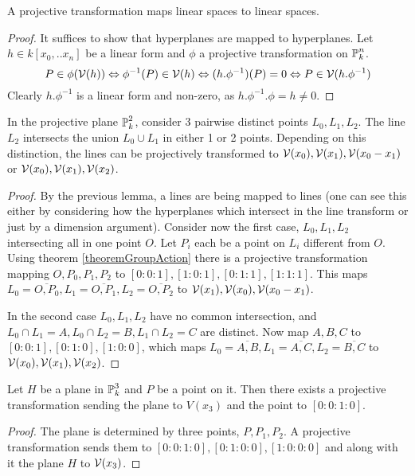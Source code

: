 \begin{lemma} \label{lemmaTransformOfLinearSpaces}
A projective transformation maps linear spaces to linear spaces.
\end{lemma}
\begin{proof}
It suffices to show that hyperplanes are mapped to hyperplanes.
Let $h \in k[x_0,..x_n]$ be a linear form and $\phi$ a projective transformation on $\operatorname{\mathbb P}^n_k$.
\begin{equation}
P \in \phi(\operatorname{\mathcal V}(h)) \Leftrightarrow \phi^{-1}(P) \in \operatorname{\mathcal V}(h) \Leftrightarrow (h.\phi^{-1})(P) = 0 \Leftrightarrow P \in \operatorname{\mathcal V}(h.\phi^{-1})
\end{equation}
Clearly $h.\phi^{-1}$ is a linear form and non-zero, as $h.\phi^{-1}.\phi = h \neq 0$.
\end{proof}


\begin{corollary}
In the projective plane $\operatorname{\mathbb P}^2_k$, consider 3 pairwise distinct points $L_0,L_1,L_2$.
The line $L_2$ intersects the union $L_0 \cup L_1$ in either 1 or 2 points.
Depending on this distinction, the lines can be projectively transformed to $\operatorname{\mathcal V}(x_0),\operatorname{\mathcal V}(x_1),\operatorname{\mathcal V}(x_0-x_1)$ or $\operatorname{\mathcal V}(x_0),\operatorname{\mathcal V}(x_1),\operatorname{\mathcal V}(x_2)$.
\end{corollary}
\begin{proof}
By the previous lemma, a lines are being mapped to lines (one can see this either by considering how the hyperplanes which intersect in the line transform or just by a dimension argument).
Consider now the first case, $L_0,L_1,L_2$ intersecting all in one point $O$.
Let $P_i$ each be a point on $L_i$ different from $O$.
Using theorem \ref{theoremGroupAction} there is a projective transformation mapping $O, P_0,P_1,P_2$ to $[0:0:1],[1:0:1],[0:1:1],[1:1:1]$.
This maps $L_0 = \overline{O,P_0}, L_1 = \overline{O,P_1}, L_2 = \overline{O,P_2}$ to $\operatorname{\mathcal V}(x_1),\operatorname{\mathcal V}(x_0),\operatorname{\mathcal V}(x_0 - x_1)$.

In the second case $L_0,L_1,L_2$ have no common intersection, and $L_0 \cap L_1 = A, L_0 \cap L_2 = B, L_1 \cap L_2 = C$ are distinct.
Now map $A,B,C$ to $[0:0:1],[0:1:0],[1:0:0]$, which maps $L_0 = \overline{A,B}, L_1=\overline{A,C}, L_2=\overline{B,C}$ to $\operatorname{\mathcal V}(x_0),\operatorname{\mathcal V}(x_1),\operatorname{\mathcal V}(x_2)$.
\end{proof}

\begin{corollary} \label{corollaryTransformPlaneWithPointOnIt}
Let $H$ be a plane in $\operatorname{\mathbb P}^3_k$ and $P$ be a point on it.
Then there exists a projective transformation sending the plane to $V(x_3)$ and the point to $[0:0:1:0]$.
\end{corollary}
\begin{proof}
The plane is determined by three points, $P, P_1,P_2$.
A projective transformation sends them to $[0:0:1:0], [0:1:0:0],[1:0:0:0]$ and along with it the plane $H$ to $\operatorname{\mathcal V}(x_3)$.
\end{proof}

